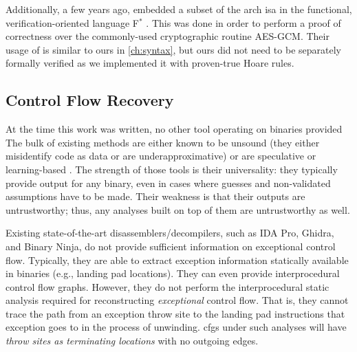 Additionally, a few years ago, \textcite{fromherz2019verified} embedded a subset of the \gls{arch} \ac{isa} in the functional, verification-oriented language F$^*$ \autocite{fstar}.
This was done in order to perform a proof of correctness over the commonly-used cryptographic routine AES-GCM.
Their usage of  is similar to ours in \cref{ch:syntax}, but ours did not need to be separately formally verified as we implemented it with proven-true Hoare rules.

\subsection{Control Flow Recovery}
At the time this work was written, no other tool operating on binaries
provided 
The bulk of existing methods are either known to be unsound (they either  misidentify code as data or are underapproximative) \autocite{schwartz2002disassembly} or are speculative or learning-based \autocite{wartell2011differentiating,khadra2016speculative}.
The strength of those tools is their universality: they typically provide output for any binary, even in cases where guesses and non-validated assumptions have to be made.
Their weakness is that their outputs are untrustworthy; thus, any analyses built on top of them are untrustworthy as well.

Existing state-of-the-art disassemblers/decompilers, such as IDA Pro, Ghidra, and Binary Ninja, do not provide sufficient information on exceptional control flow.
Typically, they are able to extract exception information statically available in binaries (e.g., landing pad locations).
They can even provide interprocedural control flow graphs.
However, they do not perform the interprocedural static analysis required for reconstructing \emph{exceptional} control flow.
That is, they cannot trace the path from an exception throw site to the landing pad instructions that exception goes to in the process of unwinding.
\Acp{cfg} under such analyses will have \emph{throw sites as terminating locations} with no outgoing edges.


